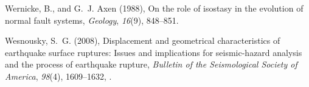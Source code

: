 \documentclass[twocolumn,grl]{AGUTeX}
\begin{document}
\begin{article}
\begin{thebibliography}{30}
Wernicke, B., and G.~J. Axen (1988), On the role of isostasy in the evolution
  of normal fault systems, \textit{Geology}, \textit{16}(9), 848--851.

Wesnousky, S.~G. (2008), Displacement and geometrical characteristics of
  earthquake surface ruptures: Issues and implications for seismic-hazard
  analysis and the process of earthquake rupture, \textit{Bulletin of the
  Seismological Society of America}, \textit{98}(4), 1609--1632,
  .

\end{thebibliography}



\end{article}


%
%
\end{document}
